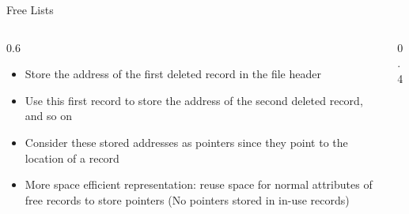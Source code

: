 \documentclass[aspectratio=169, xcolor=dvipsnames]{beamer}
\begin{document}
\begin{frame}{Free Lists}
    \begin{columns}
        \begin{column}{0.6\textwidth}
            \begin{block}{}
                \begin{itemize}[<+->]
                    \item Store the address of the first deleted record in the file header
                    \item Use this first record to store the address of the second deleted record, and so on
                    \item Consider these stored addresses as pointers since they point to the location of a record
                    \item More space efficient representation: reuse space for normal attributes of free records to store pointers (No pointers stored in in-use records)
                \end{itemize}
            \end{block}
        \end{column}
        \begin{column}{0.4\textwidth}
            \begin{table}[]
                \centering
            \end{table}
        \end{column}
    \end{columns}
\end{frame}
\end{document}
